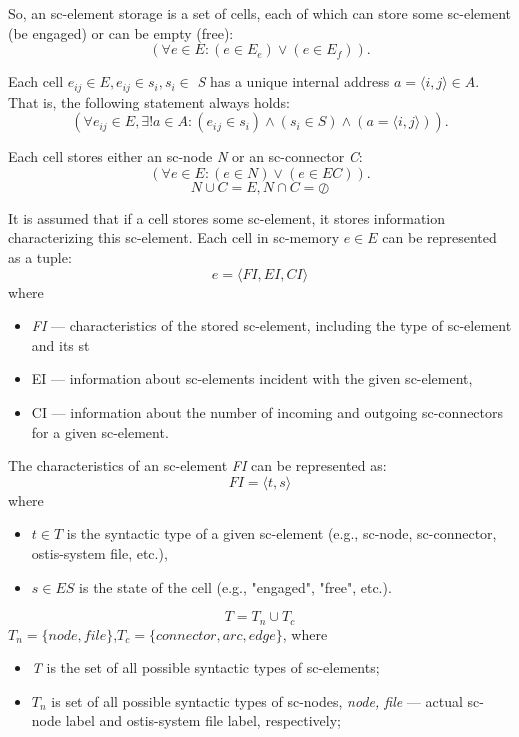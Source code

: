 \documentclass{scndocument}
\begin{document}
\begin{SCn}
\begin{multicols}{2}
\begin{itemize}
\end{itemize}
\par So, an sc-element storage is a set of cells, each of
which can store some sc-element (be engaged) or can be
empty (free):
\[({\forall e \in E : (e \in E_e )\vee (e \in E_f)}).\]
\par Each cell $e_{ij} \in \textit{E} , e_{ij} \in  s_i , s_i \in$ \textit{S} has a unique internal address $\textit{a} = \langle i, j  \rangle \in A$. That is, the following statement always holds:
\[(\forall e_{ij} \in E, \exists ! a \in A : (e_i{}_j \in s_i) \wedge (s_i \in S) \wedge(a = \langle i, j  \rangle)).\]
\par Each cell stores either an sc-node \textit{N} or an sc-connector
\textit{C}:
\[({\forall e \in E : (e \in N )\vee (e \in EC)}).\]
\[N \cup C = E, N \cap C = \oslash\]
\par It is assumed that if a cell stores some sc-element, it
stores information characterizing this sc-element. Each
cell in sc-memory $e \in E$ can be represented as a tuple:
\[e =  \langle FI, EI, CI  \rangle\]
where
\begin{itemize}
\item \textit{FI} — characteristics of the stored sc-element, including the type of sc-element and its st
\item EI — information about sc-elements incident with
the given sc-element,
\item CI — information about the number of incoming
and outgoing sc-connectors for a given sc-element.
\end{itemize}
\par The characteristics of an sc-element \textit{FI} can be represented as:
\[FI =  \langle t,s  \rangle\]
where
\begin{itemize}
\item $t \in T$ is the syntactic type of a given sc-element
(e.g., sc-node, sc-connector, ostis-system file, etc.),
\item $s \in ES$ is the state of the cell (e.g., "engaged",
"free", etc.).
\end{itemize}
\[T =  T_n \cup T_c\]
$T_n = \{node, f ile\}$,$T_c = \{connector, arc, edge\}$,
where
\begin{itemize}
\item \textit{T} is the set of all possible syntactic types of sc-elements;
\item \textit {$T_n$} is set of all possible syntactic types of sc-nodes,
\textit{node, file} — actual sc-node label and ostis-system file label, respectively;

\end{itemize}
\end{multicols}
\end{SCn}
\end{document}
